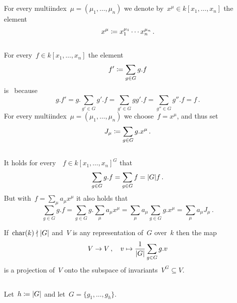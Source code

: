 \section{}

For every multiindex~$\mu = (\mu_1, \dotsc, \mu_n)$ we denote by~$x^\mu \in k[x_1, \dotsc, x_n]$ the element
\[
            x^\mu
  \coloneqq  x_1^{\mu_1} \dotsm x_n^{\mu_n} \,.
\]





\subsection{}

For every~$f \in k[x_1, \dotsc, x_n]$ the element
\[
            f'
  \coloneqq  \sum_{g \in G} g.f
\]
is~ because
\[
    g.f'
  = g.\sum_{g' \in G} g'.f
  = \sum_{g' \in G} g g'.f
  = \sum_{g'' \in G} g''.f
  = f \,.
\]
For every multiindex~$\mu = (\mu_1, \dotsc, \mu_n)$ we choose~$f = x^\mu$, and thus set
\[
            J_\mu
  \coloneqq  \sum_{g \in G} g.x^\mu  \,.
\]





\subsection{}

It holds for every~~$f \in k[x_1, \dotsc, x_n]^G$ that
\[
    \sum_{g \in G} g.f
  = \sum_{g \in G} f
  = \lvert G\rvert f \,.
\]
But with~$f = \sum_{\mu} a_\mu x^\mu$ it also holds that
\[
    \sum_{g \in G} g.f
  = \sum_{g \in G} g.\sum_{\mu} a_\mu x^\mu
  = \sum_{\mu} a_\mu \sum_{g \in G} g.x^\mu
  = \sum_{\mu} a_\mu J_\mu \,.
\]

\begin{remark}
  If~$\operatorname{char}(k) \nmid \lvert G\rvert$ and~$V$ is any representation of~$G$ over~$k$ then the map
  \[
            V
    \to     V \,,
    \quad   v
    \mapsto \frac{1}{\lvert G\rvert} \sum_{g \in G} g.v
  \]
  is a projection of~$V$ onto the subspace of invariants~$V^G \subseteq V$.
\end{remark}





\subsection{}

Let~$h \coloneqq \lvert G\rvert$ and let~$G = \{g_1, \dotsc, g_h\}$.

